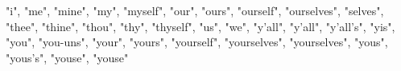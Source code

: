 "i", "me", "mine", "my", "myself", "our", "ours", "ourself",
"ourselves", "selves", "thee", "thine", "thou", "thy", "thyself", "us",
"we", "y'all", "y'all", "y'all's", "yis", "you", "you-uns", "your",
"yours", "yourself", "yourselves", "yourselves", "yous", "yous's",
"youse", "youse"
